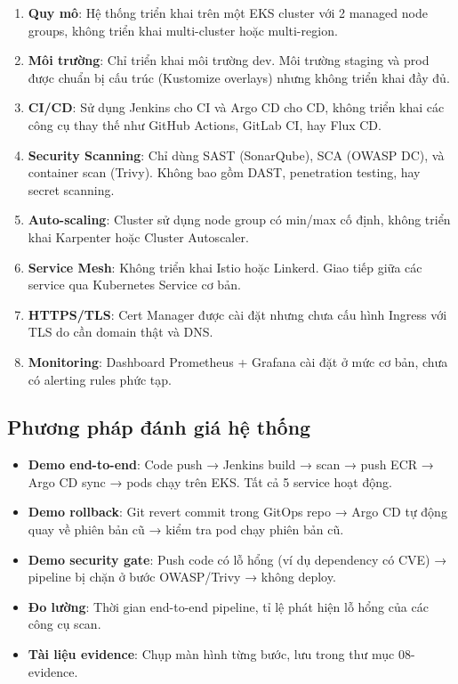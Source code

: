 \documentclass[12pt,a4paper]{article}
\begin{document}
\begin{enumerate}[leftmargin=*,nosep]
  \item \textbf{Quy mô}: Hệ thống triển khai trên một EKS cluster với 2 managed node groups, không triển khai multi-cluster hoặc multi-region.
  \item \textbf{Môi trường}: Chỉ triển khai môi trường dev. Môi trường staging và prod được chuẩn bị cấu trúc (Kustomize overlays) nhưng không triển khai đầy đủ.
  \item \textbf{CI/CD}: Sử dụng Jenkins cho CI và Argo CD cho CD, không triển khai các công cụ thay thế như GitHub Actions, GitLab CI, hay Flux CD.
  \item \textbf{Security Scanning}: Chỉ dùng SAST (SonarQube), SCA (OWASP DC), và container scan (Trivy). Không bao gồm DAST, penetration testing, hay secret scanning.
  \item \textbf{Auto-scaling}: Cluster sử dụng node group có min/max cố định, không triển khai Karpenter hoặc Cluster Autoscaler.
  \item \textbf{Service Mesh}: Không triển khai Istio hoặc Linkerd. Giao tiếp giữa các service qua Kubernetes Service cơ bản.
  \item \textbf{HTTPS/TLS}: Cert Manager được cài đặt nhưng chưa cấu hình Ingress với TLS do cần domain thật và DNS.
  \item \textbf{Monitoring}: Dashboard Prometheus + Grafana cài đặt ở mức cơ bản, chưa có alerting rules phức tạp.
\end{enumerate}

\subsection{Phương pháp đánh giá hệ thống}

\begin{itemize}[leftmargin=*,nosep]
  \item \textbf{Demo end-to-end}: Code push → Jenkins build → scan → push ECR → Argo CD sync → pods chạy trên EKS. Tất cả 5 service hoạt động.
  \item \textbf{Demo rollback}: Git revert commit trong GitOps repo → Argo CD tự động quay về phiên bản cũ → kiểm tra pod chạy phiên bản cũ.
  \item \textbf{Demo security gate}: Push code có lỗ hổng (ví dụ dependency có CVE) → pipeline bị chặn ở bước OWASP/Trivy → không deploy.
  \item \textbf{Đo lường}: Thời gian end-to-end pipeline, tỉ lệ phát hiện lỗ hổng của các công cụ scan.
  \item \textbf{Tài liệu evidence}: Chụp màn hình từng bước, lưu trong thư mục 08-evidence.
\end{itemize}
\end{document}
